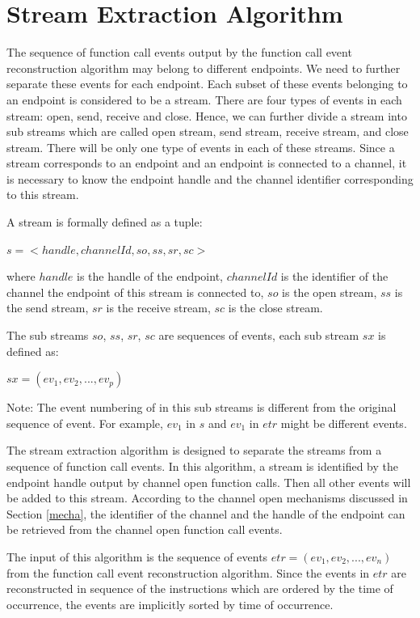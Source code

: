 \section{Stream Extraction Algorithm}
The sequence of function call events output by the function call event reconstruction algorithm may belong to different endpoints. We need to further separate these events for each endpoint. Each subset of these events belonging to an endpoint is considered to be a stream. There are four types of events in each stream: open, send, receive and close. Hence, we can further divide a stream into sub streams which are called open stream, send stream, receive stream, and close stream. There will be only one type of events in each of these streams. Since a stream corresponds to an endpoint and an endpoint is connected to a channel, it is necessary to know the endpoint handle and the channel identifier corresponding to this stream. 

A stream is formally defined as a tuple:

$s = <handle, channelId, so, ss, sr, sc>$

where $handle$ is the handle of the endpoint, $channelId$ is the identifier of the channel the endpoint of this stream is connected to, $so$ is the open stream, $ss$ is the send stream, $sr$ is the receive stream, $sc$ is the close stream. 

The sub streams $so$, $ss$, $sr$, $sc$ are sequences of events, each sub stream $sx$ is defined as:

$sx = (ev_1, ev_2, ..., ev_p)$

Note: The event numbering of in this sub streams is different from the original sequence of event. For example, $ev_1$ in $s$ and $ev_1$ in $etr$ might be different events.

The stream extraction algorithm is designed to separate the streams from a sequence of function call events. In this algorithm, a stream is identified by the endpoint handle output by channel open function calls. Then all other events will be added to this stream.  According to the channel open mechanisms discussed in Section \ref{mecha}, the identifier of the channel and the handle of the endpoint can be retrieved from the channel open function call events.

The input of this algorithm is the sequence of events $etr = (ev_1, ev_2, ..., ev_n)$ from the function call event reconstruction algorithm. Since the events in $etr$ are reconstructed in sequence of the instructions which are ordered by the time of occurrence, the events are implicitly sorted by time of occurrence. 

